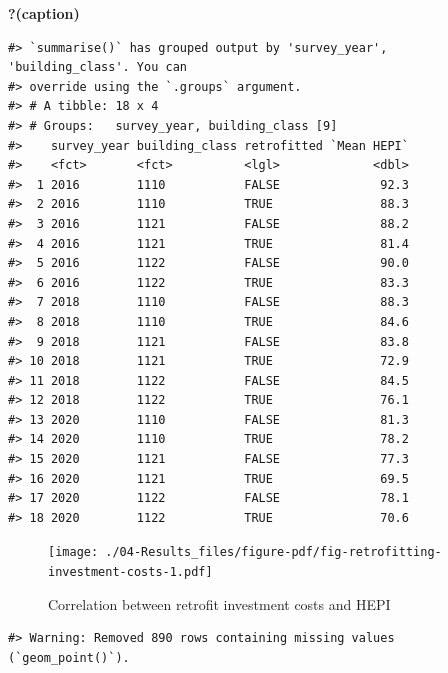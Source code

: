 \documentclass[
  letterpaper,
  DIV=11,
  numbers=noendperiod]{scrreprt}
\begin{document}
\begin{table}

\caption{\textbf{?(caption)}}\begin{minipage}[t]{\linewidth}

{\centering 

\begin{verbatim}
#> `summarise()` has grouped output by 'survey_year', 'building_class'. You can
#> override using the `.groups` argument.
#> # A tibble: 18 x 4
#> # Groups:   survey_year, building_class [9]
#>    survey_year building_class retrofitted `Mean HEPI`
#>    <fct>       <fct>          <lgl>             <dbl>
#>  1 2016        1110           FALSE              92.3
#>  2 2016        1110           TRUE               88.3
#>  3 2016        1121           FALSE              88.2
#>  4 2016        1121           TRUE               81.4
#>  5 2016        1122           FALSE              90.0
#>  6 2016        1122           TRUE               83.3
#>  7 2018        1110           FALSE              88.3
#>  8 2018        1110           TRUE               84.6
#>  9 2018        1121           FALSE              83.8
#> 10 2018        1121           TRUE               72.9
#> 11 2018        1122           FALSE              84.5
#> 12 2018        1122           TRUE               76.1
#> 13 2020        1110           FALSE              81.3
#> 14 2020        1110           TRUE               78.2
#> 15 2020        1121           FALSE              77.3
#> 16 2020        1121           TRUE               69.5
#> 17 2020        1122           FALSE              78.1
#> 18 2020        1122           TRUE               70.6
\end{verbatim}

}

\end{minipage}%

\end{table}

\begin{figure}

{\centering \texttt{[image: ./04-Results\_files/figure-pdf/fig-retrofitting-investment-costs-1.pdf]}

}

\caption{\label{fig-retrofitting-investment-costs}Correlation between
retrofit investment costs and HEPI}

\end{figure}

\begin{verbatim}
#> Warning: Removed 890 rows containing missing values (`geom_point()`).
\end{verbatim}
\end{document}
